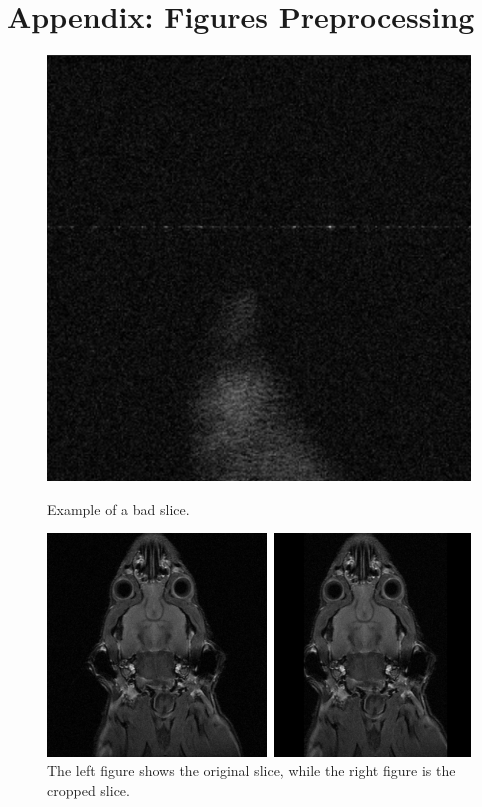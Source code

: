 \documentclass[twocolumn]{article}
\begin{document}
\begin{appendices}
\begin{ganttchart}
\end{ganttchart}

\newpage
\section{Appendix: Figures Preprocessing}
\label{Appendix: Figures Preprocessing}

\begin{figure}[h]
    \centering
    \begin{minipage}{0.3\textwidth}
        \centering
        \includegraphics[width=\linewidth]{bad_slice.png}
        \caption{Example of a bad slice.}
        \label{fig:bad_slice}
    \end{minipage}%
    \hfill
    \begin{minipage}{0.45\textwidth}
        \centering
        \includegraphics[width=\linewidth]{comparision cropped vs non cropped.png}
        \caption{The left figure shows the original slice, while the right figure is the cropped slice.}
        \label{fig:comparision-cropped}
    \end{minipage}
\end{figure}




\end{appendices}
\end{document}
